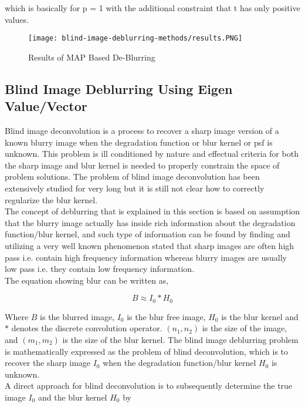 \documentclass{article}
\begin{document}
which is basically for p = 1 with the additional constraint that t has only positive values. 

\begin{figure}
    \centering
    \texttt{[image: blind-image-deblurring-methods/results.PNG]}
    \caption{Results of MAP Based De-Blurring}
    \label{fig:results}
\end{figure}

\subsection{Blind Image Deblurring Using Eigen Value/Vector}
Blind image deconvolution is a process to recover a sharp image version of a known blurry image when the degradation function or blur kernel or psf is unknown. \cite{25} This problem is ill conditioned by nature and effectual criteria for both the sharp image and blur kernel is needed to properly constrain the space of problem solutions. The problem of blind image deconvolution has been extensively studied for very long but it is still not clear how to correctly regularize the blur kernel.  \\

The concept of deblurring that is explained in this section is based on assumption that the blurry image actually has inside rich information about the degradation function/blur kernel, and such type of information can be found by finding and utilizing a very well known phenomenon stated that sharp images are often high pass i.e. contain high frequency information whereas blurry images are usually low pass i.e. they contain low frequency information. \\

The equation showing blur can be written as, 

\begin{equation}
    B \approx I_0 * H_0
\end{equation}

Where $B$ is the blurred image, $I_0$ is the blur free image, $H_0$ is the blur kernel and $*$ denotes the discrete convolution operator. $(n_1, n_2)$ is the size of the image, and $(m_1, m_2)$ is the size of the blur kernel. The blind image deblurring problem is mathematically expressed as the problem of blind deconvolution, which is to recover the sharp image $I_0$ when the degradation function/blur kernel $H_0$ is unknown. \\

A direct approach for blind deconvolution is to subsequently determine the true image $I_0$ and the blur kernel $H_0$ by 
\end{document}
